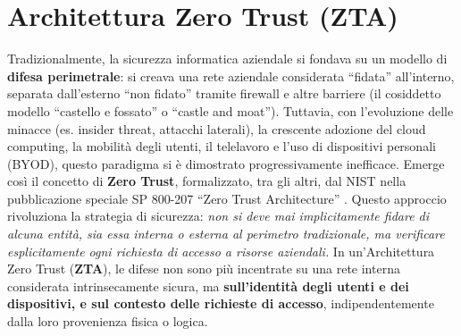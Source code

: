 \section{Architettura Zero Trust (ZTA)}
\label{sec:zero_trust}
Tradizionalmente, la sicurezza informatica aziendale si fondava su un modello di \textbf{difesa perimetrale}: si creava una rete aziendale considerata “fidata” all’interno, separata dall’esterno “non fidato” tramite firewall e altre barriere (il cosiddetto modello “castello e fossato” o \enquote{castle and moat}). Tuttavia, con l'evoluzione delle minacce (es. insider threat, attacchi laterali), la crescente adozione del cloud computing, la mobilità degli utenti, il telelavoro e l'uso di dispositivi personali (BYOD), questo paradigma si è dimostrato progressivamente inefficace. Emerge così il concetto di \textbf{Zero Trust}, formalizzato, tra gli altri, dal NIST nella pubblicazione speciale SP 800-207 \enquote{Zero Trust Architecture} \cite{nistZeroTrust}. Questo approccio rivoluziona la strategia di sicurezza: \textit{non si deve mai implicitamente fidare di alcuna entità, sia essa interna o esterna al perimetro tradizionale, ma verificare esplicitamente ogni richiesta di accesso a risorse aziendali.} In un'Architettura Zero Trust (\textbf{ZTA}), le difese non sono più incentrate su una rete interna considerata intrinsecamente sicura, ma \textbf{sull’identità degli utenti e dei dispositivi, e sul contesto delle richieste di accesso}, indipendentemente dalla loro provenienza fisica o logica.

